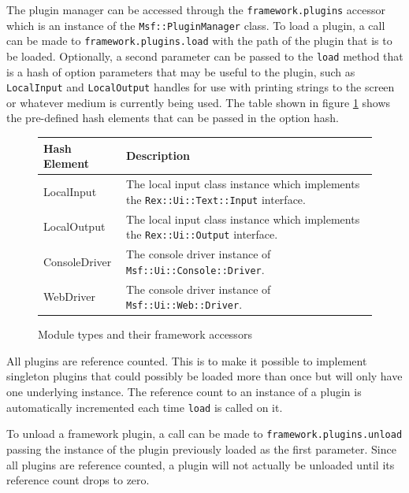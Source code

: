 \documentclass{report}
\begin{document}
\par
The plugin manager can be accessed through the
\texttt{framework.plugins} accessor which is an instance of the
\texttt{Msf::PluginManager} class. To load a plugin, a call can be
made to \texttt{framework.plugins.load} with the path of the plugin
that is to be loaded.  Optionally, a second parameter can be passed
to the \texttt{load} method that is a hash of option parameters that
may be useful to the plugin, such as \texttt{LocalInput} and
\texttt{LocalOutput} handles for use with printing strings to the
screen or whatever medium is currently being used.  The table shown
in figure \ref{fig-table-plugin-hash} shows the pre-defined hash
elements that can be passed in the option hash.

\begin{figure}[h]
\begin{center}
\begin{tabular}{|l|p{3.5in}|}
\hline
\textbf{Hash Element} & \textbf{Description} \\
\hline
LocalInput & The local input class instance which implements the \texttt{Rex::Ui::Text::Input} interface. \\
\hline
LocalOutput & The local input class instance which implements the \texttt{Rex::Ui::Output} interface. \\
\hline
ConsoleDriver & The console driver instance of \texttt{Msf::Ui::Console::Driver}. \\
\hline
WebDriver & The console driver instance of \texttt{Msf::Ui::Web::Driver}. \\
\hline
\end{tabular}
\caption{Module types and their framework accessors}
\label{fig-table-plugin-hash}
\end{center}
\end{figure}

\par
All plugins are reference counted.  This is to make it possible to
implement singleton plugins that could possibly be loaded more than
once but will only have one underlying instance.  The reference
count to an instance of a plugin is automatically incremented each
time \texttt{load} is called on it.

\par
To unload a framework plugin, a call can be made to
\texttt{framework.plugins.unload} passing the instance of the plugin
previously loaded as the first parameter.  Since all plugins are
reference counted, a plugin will not actually be unloaded until its
reference count drops to zero.
\end{document}
